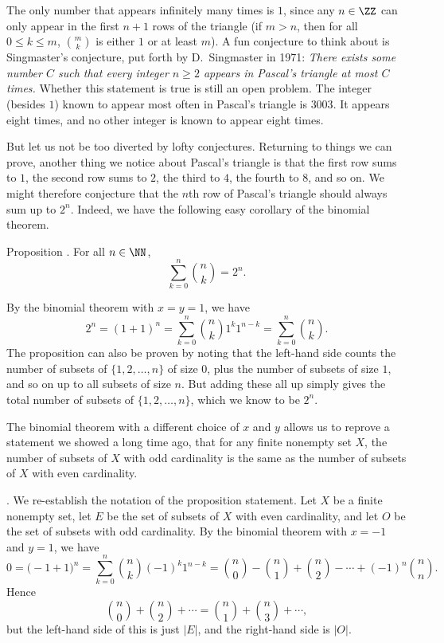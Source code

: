 The only number that appears infinitely many times is $1$, since any $n\in \ZZ$
can only appear in the first $n+1$ rows of the triangle (if $m>n$, then for all
$0\le k\le m$, ${m\choose k}$ is either $1$ or at least $m$). A fun conjecture to think
about is Singmaster's conjecture, put forth by D.~Singmaster in 1971: {\sl There
exists some number $C$ such that every integer $n\ge 2$ appears in Pascal's triangle
at most $C$ times.} Whether this statement is true is still an open problem.
The integer (besides $1$) known to appear most often in Pascal's triangle is
$3003$. It appears eight times, and no other integer is known to appear eight times.

But let us not be too diverted by lofty conjectures. Returning to things we can prove,
another thing we notice about Pascal's triangle is that the first row sums to $1$, the second
row sums to $2$, the third to $4$, the fourth to $8$, and so on. We might therefore
conjecture that the $n$th row of Pascal's triangle should always sum up to $2^n$. Indeed, we
have the following easy corollary of the binomial theorem.

\proclaim Proposition \advthm. For all $n\in \NN$,
$$\sum_{k=0}^n {n\choose k} = 2^n.$$

\proof By the binomial theorem with $x=y=1$, we have
$$2^n = (1+1)^n = \sum_{k=0}^n {n\choose k} 1^k 1^{n-k} = \sum_{k=0}^n {n\choose k}.$$
The proposition can also be proven by noting that the left-hand side counts the number
of subsets of $\{1,2,\ldots,n\}$ of size $0$, plus the number of subsets of size $1$,
and so on up to all subsets of size $n$. But adding these all up simply gives the total number
of subsets of $\{1,2,\ldots, n\}$, which we know to be $2^n$.\slug

The binomial theorem with a different choice of $x$ and $y$ allows us to reprove a statement
we showed a long time ago, that for any finite nonempty set $X$, the number of subsets of $X$ with
odd cardinality is the same as the number of subsets of $X$ with even cardinality.

\medskip{}.\enspace
We re-establish the notation of the proposition statement. Let $X$ be a finite nonempty set,
let $E$ be the set of subsets of $X$ with even cardinality, and let $O$ be the set of
subsets with odd cardinality. By the binomial theorem with $x=-1$ and $y = 1$, we have
$$0 = \bigl(-1+1\bigr)^n = \sum_{k=0}^n {n\choose k} (-1)^k 1^{n-k}
= {n\choose 0} - {n\choose 1} + {n\choose 2} -\cdots + (-1)^n{n\choose n}.$$
Hence
$${n\choose 0} + {n\choose 2} +\cdots = {n\choose 1} + {n\choose 3} + \cdots,$$
but the left-hand side of this is just $|E|$, and the right-hand side is $|O|$.\slug

